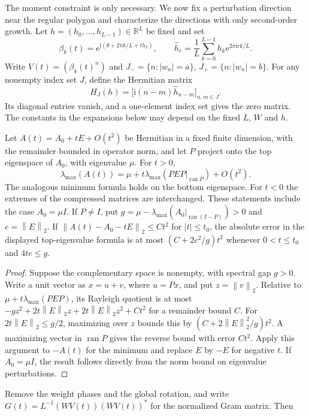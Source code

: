 \documentclass[10pt,twoside,final]{siamart1116}
\numberwithin{equation}{section}
\numberwithin{theorem}{section}
\newcommand{\R}{\mathbb R}
\newcommand{\norm}[1]{\left\lVert#1\right\rVert_2}
\newcommand{\e}{\mathrm e}
\newcommand{\ii}{\mathrm i}
\begin{document}
The moment constraint is only necessary. We now fix a perturbation direction near the
regular polygon and characterize the directions with only second-order growth. Let
$h=(h_0,\ldots,h_{L-1})\in\R^L$ be fixed and set
\begin{equation}\label{eq:direction-nodes}
\beta_k(t)=\e^{\ii(\theta+2\pi k/L+t h_k)},\qquad
\widehat h_r=\frac1L\sum_{k=0}^{L-1}h_k \e^{2\pi\ii rk/L}.
\end{equation}
Write $V(t)=(\beta_k(t)^n)$ and
$J_-=\{n:|w_n|=a\}$, $J_+=\{n:|w_n|=b\}$. For any nonempty index set $J$, define the
Hermitian matrix
\[
H_J(h)=\bigl[\ii(n-m)\widehat h_{n-m}\bigr]_{n,m\in J}.
\]
Its diagonal entries vanish, and a one-element index set gives the zero matrix. The
constants in the expansions below may depend on the fixed $L$, $W$ and $h$.

\begin{lemma}\label{lem:clusters}
Let $A(t)=A_0+tE+O(t^2)$ be Hermitian in a fixed finite dimension, with the
remainder bounded in operator norm, and let $P$ project onto the top eigenspace
of $A_0$, with eigenvalue $\mu$. For $t>0$,
\[
\lambda_{\max}(A(t))=\mu+t\lambda_{\max}(PEP|_{\operatorname{ran}P})+O(t^2).
\]
The analogous minimum formula holds on the bottom eigenspace. For $t<0$ the
extremes of the compressed matrices are interchanged. These statements include
the case $A_0=\mu I$. If $P\ne I$, put
$g=\mu-\lambda_{\max}(A_0|_{\operatorname{ran}(I-P)})>0$ and
$e=\norm E$. If $\norm{A(t)-A_0-tE}\le Ct^2$ for $|t|\le t_0$,
the absolute error in the displayed top-eigenvalue formula is at most
$(C+2e^2/g)t^2$ whenever $0<t\le t_0$ and $4te\le g$.
\end{lemma}
\begin{proof}
Suppose the complementary space is nonempty, with spectral gap $g>0$.
Write a unit vector as $x=u+v$, where $u=Px$, and put $z=\norm v$.
Relative to $\mu+t\lambda_{\max}(PEP)$, its Rayleigh quotient is at most
$-gz^2+2t\norm E z+2t\norm E z^2+Ct^2$ for a remainder bound $C$.
For $2t\norm E\le g/2$, maximizing over $z$ bounds this by
$(C+2\norm E^2/g)t^2$. A maximizing vector in $\operatorname{ran}P$ gives the
reverse bound with error $Ct^2$. Apply this argument to $-A(t)$ for the minimum
and replace $E$ by $-E$ for negative $t$. If $A_0=\mu I$, the result follows
directly from the norm bound on eigenvalue perturbations.
\end{proof}

Remove the weight phases and the global rotation, and write
$G(t)=L^{-1}(WV(t))(WV(t))^*$ for the normalized Gram matrix. Then
\end{document}
